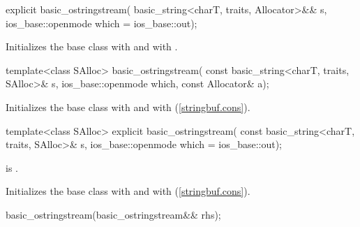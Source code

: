 %
\begin{itemdecl}
explicit basic_ostringstream(
  basic_string<charT, traits, Allocator>&& s,
  ios_base::openmode which = ios_base::out);
\end{itemdecl}

\begin{itemdescr}
\pnum
\effects
Initializes the base class with
and  with
.
\end{itemdescr}

%
\begin{itemdecl}
template<class SAlloc>
  basic_ostringstream(
    const basic_string<charT, traits, SAlloc>& s,
    ios_base::openmode which, const Allocator& a);
\end{itemdecl}

\begin{itemdescr}
\pnum
\effects
Initializes the base class with
and  with
\linebreak(\ref{stringbuf.cons}). %
\end{itemdescr}

%
\begin{itemdecl}
template<class SAlloc>
  explicit basic_ostringstream(
    const basic_string<charT, traits, SAlloc>& s,
    ios_base::openmode which = ios_base::out);
\end{itemdecl}

\begin{itemdescr}
\pnum
\constraints {} is .

\pnum
\effects
Initializes the base class with
and  with
\linebreak(\ref{stringbuf.cons}). %
\end{itemdescr}

%
\begin{itemdecl}
basic_ostringstream(basic_ostringstream&& rhs);
\end{itemdecl}


